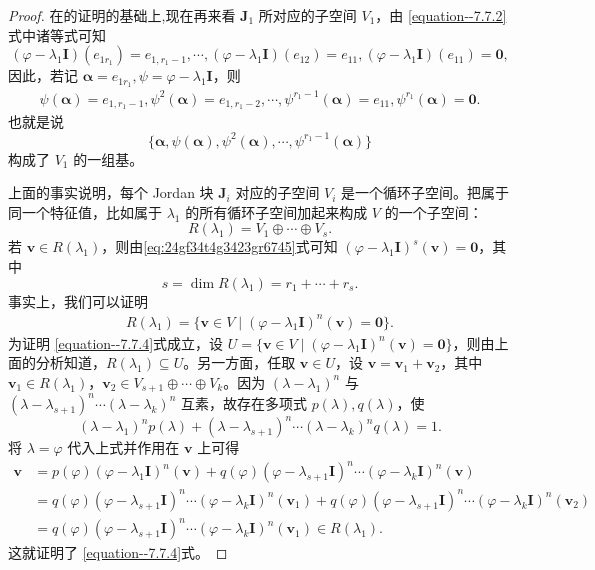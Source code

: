 \documentclass[../../main.tex]{subfiles}%
\begin{document}
\begin{proof}

在的证明的基础上,现在再来看 $\boldsymbol{J}_1$ 所对应的子空间 $V_1$，由 \eqref{equation--7.7.2}式中诸等式可知
\[
(\varphi - \lambda_1\boldsymbol{I})(e_{1r_1}) = e_{1,r_1 - 1}, \cdots, (\varphi - \lambda_1\boldsymbol{I})(e_{12}) = e_{11}, (\varphi - \lambda_1\boldsymbol{I})(e_{11}) = \boldsymbol{0},
\]
因此，若记 $\boldsymbol{\alpha} = e_{1r_1}, \psi = \varphi - \lambda_1\boldsymbol{I}$，则
\begin{align}\label{eq:24gf34t4g3423gr6745}
\psi(\boldsymbol{\alpha}) = e_{1,r_1 - 1},  \psi^2(\boldsymbol{\alpha}) = e_{1,r_1 - 2},  \cdots,  \psi^{r_1 - 1}(\boldsymbol{\alpha}) = e_{11},  \psi^{r_1}(\boldsymbol{\alpha}) = \boldsymbol{0}.
\end{align}
也就是说
\[
\{\boldsymbol{\alpha}, \psi(\boldsymbol{\alpha}), \psi^2(\boldsymbol{\alpha}), \cdots, \psi^{r_1 - 1}(\boldsymbol{\alpha})\}
\]
构成了 $V_1$ 的一组基。

上面的事实说明，每个 Jordan 块 $\boldsymbol{J}_i$ 对应的子空间 $V_i$ 是一个循环子空间。把属于同一个特征值，比如属于 $\lambda_1$ 的所有循环子空间加起来构成 $V$ 的一个子空间：
\[
R(\lambda_1) = V_1 \oplus \cdots \oplus V_s.
\]
若 $\boldsymbol{v} \in R(\lambda_1)$，则由\eqref{eq:24gf34t4g3423gr6745}式可知 $(\varphi - \lambda_1\boldsymbol{I})^s(\boldsymbol{v}) = \boldsymbol{0}$，其中
\[
s = \dim R(\lambda_1) = r_1 + \cdots + r_s.
\]
事实上，我们可以证明
\begin{align}\label{equation--7.7.4}
R(\lambda_1) = \{\boldsymbol{v} \in V \mid (\varphi - \lambda_1\boldsymbol{I})^n(\boldsymbol{v}) = \boldsymbol{0}\}.
\end{align}
为证明 \eqref{equation--7.7.4}式成立，设 $U = \{\boldsymbol{v} \in V \mid (\varphi - \lambda_1\boldsymbol{I})^n(\boldsymbol{v}) = \boldsymbol{0}\}$，则由上面的分析知道，$R(\lambda_1) \subseteq U$。另一方面，任取 $\boldsymbol{v} \in U$，设 $\boldsymbol{v} = \boldsymbol{v}_1 + \boldsymbol{v}_2$，其中 $\boldsymbol{v}_1 \in R(\lambda_1)$，$\boldsymbol{v}_2 \in V_{s + 1} \oplus \cdots \oplus V_k$。因为 $(\lambda - \lambda_1)^n$ 与 $(\lambda - \lambda_{s + 1})^n \cdots (\lambda - \lambda_k)^n$ 互素，故存在多项式 $p(\lambda), q(\lambda)$，使
\[
(\lambda - \lambda_1)^n p(\lambda) + (\lambda - \lambda_{s + 1})^n \cdots (\lambda - \lambda_k)^n q(\lambda) = 1.
\]
将 $\lambda = \varphi$ 代入上式并作用在 $\boldsymbol{v}$ 上可得
\begin{align*}
\boldsymbol{v} &= p(\varphi)(\varphi - \lambda_1\boldsymbol{I})^n(\boldsymbol{v}) + q(\varphi)(\varphi - \lambda_{s + 1}\boldsymbol{I})^n \cdots (\varphi - \lambda_k\boldsymbol{I})^n(\boldsymbol{v}) \\
&= q(\varphi)(\varphi - \lambda_{s + 1}\boldsymbol{I})^n \cdots (\varphi - \lambda_k\boldsymbol{I})^n(\boldsymbol{v}_1) + q(\varphi)(\varphi - \lambda_{s + 1}\boldsymbol{I})^n \cdots (\varphi - \lambda_k\boldsymbol{I})^n(\boldsymbol{v}_2) \\
&= q(\varphi)(\varphi - \lambda_{s + 1}\boldsymbol{I})^n \cdots (\varphi - \lambda_k\boldsymbol{I})^n(\boldsymbol{v}_1) \in R(\lambda_1).
\end{align*}
这就证明了 \eqref{equation--7.7.4}式。


\end{proof}
\end{document}
